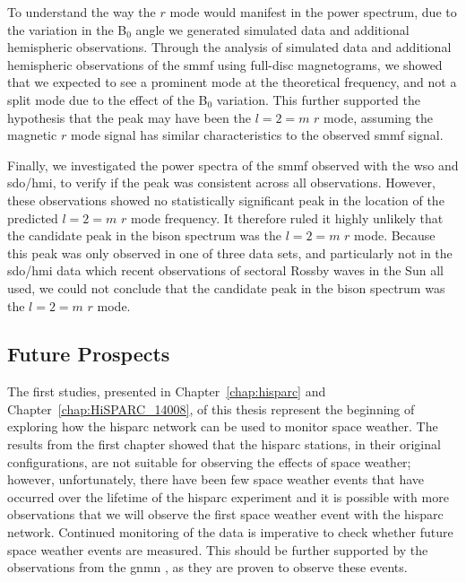 To understand the way the $r$ mode would manifest in the power spectrum, due to the variation in the B$_0$ angle we generated simulated data and additional hemispheric observations. Through the analysis of simulated data and additional hemispheric observations of the \gls{smmf} using full-disc magnetograms, we showed that we expected to see a prominent mode at the theoretical frequency, and not a split mode due to the effect of the B$_0$ variation. This further supported the hypothesis that the peak may have been the $l=2=m$ $r$ mode, assuming the magnetic $r$ mode signal has similar characteristics to the observed \gls{smmf} signal.

Finally, we investigated the power spectra of the \gls{smmf} observed with the \gls{wso} and \gls{sdo/hmi}, to verify if the peak was consistent across all observations. However, these observations showed no statistically significant peak in the location of the predicted $l=2=m$ $r$ mode frequency. It therefore ruled it highly unlikely that the candidate peak in the \gls{bison} spectrum was the $l=2=m$ $r$ mode. Because this peak was only observed in one of three data sets, and particularly not in the \gls{sdo/hmi} data which recent observations of sectoral Rossby waves in the Sun all used, we could not conclude that the candidate peak in the \gls{bison} spectrum was the $l=2=m$ $r$ mode. 


\subsection*{Future Prospects}

The first studies, presented in Chapter~\ref{chap:hisparc} and Chapter~\ref{chap:HiSPARC_14008}, of this thesis represent the beginning of exploring how the \gls{hisparc} network can be used to monitor space weather. The results from the first chapter showed that the \gls{hisparc} stations, in their original configurations, are not suitable for observing the effects of space weather; however, unfortunately, there have been few space weather events that have occurred over the lifetime of the \gls{hisparc} experiment and it is possible with more observations that we will observe the first space weather event with the \gls{hisparc} network. Continued monitoring of the data is imperative to check whether future space weather events are measured. This should be further supported by the observations from the \gls{gnmn} \citep{mishev_current_2020}, as they are proven to observe these events.

